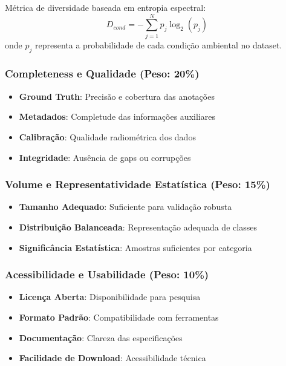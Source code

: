 Métrica de diversidade baseada em entropia espectral:
\begin{equation}
D_{cond} = -\sum_{j=1}^{N} p_j \log_2(p_j)
\end{equation}
onde $p_j$ representa a probabilidade de cada condição ambiental no dataset.

\subsubsection{Completeness e Qualidade (Peso: 20\%)}
\begin{itemize}
    \item \textbf{Ground Truth}: Precisão e cobertura das anotações
    \item \textbf{Metadados}: Completude das informações auxiliares
    \item \textbf{Calibração}: Qualidade radiométrica dos dados
    \item \textbf{Integridade}: Ausência de gaps ou corrupções
\end{itemize}

\subsubsection{Volume e Representatividade Estatística (Peso: 15\%)}
\begin{itemize}
    \item \textbf{Tamanho Adequado}: Suficiente para validação robusta
    \item \textbf{Distribuição Balanceada}: Representação adequada de classes
    \item \textbf{Significância Estatística}: Amostras suficientes por categoria
\end{itemize}

\subsubsection{Acessibilidade e Usabilidade (Peso: 10\%)}
\begin{itemize}
    \item \textbf{Licença Aberta}: Disponibilidade para pesquisa
    \item \textbf{Formato Padrão}: Compatibilidade com ferramentas
    \item \textbf{Documentação}: Clareza das especificações
    \item \textbf{Facilidade de Download}: Acessibilidade técnica
\end{itemize}

